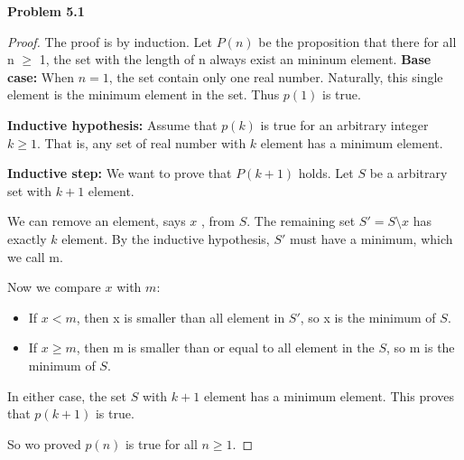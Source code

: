 \documentclass[12pt]{article}
\begin{document}
\noindent \textbf{Problem 5.1}
\smallbreak
\begin{proof}
    The proof is by induction. Let $P(n)$ be the proposition that there for all n $\ge$ 1, the set with the length of n always exist an mininum element.
    \textbf{Base case:} When $n = 1$, the set contain only one real number. Naturally, this single element is the minimum element in the set. Thus $p(1)$ is true.

    \textbf{Inductive hypothesis:} Assume that $p(k)$ is true for an arbitrary integer $k \ge 1$. That is, any set of real number with $k$ element has a minimum element.

    \textbf{Inductive step:} We want to prove that $P(k + 1)$ holds. Let $S$ be a arbitrary set with $k + 1$ element.

    We can remove an element, says $x$ , from $S$. The remaining set $S' = S \setminus x$ has exactly $k$ element. By the inductive hypothesis, $S'$ must have a minimum, which we call m. 

    Now we compare $x$ with $m$:
    \begin{itemize}
        \item If $x < m$, then x is smaller than all element in $S'$, so x is the minimum of $S$.
        \item If $x \ge m$, then m is smaller than or equal to all element in the $S$, so m is the minimum of $S$.
    \end{itemize}
    In either case, the set $S$ with $k + 1$ element has a minimum element. This proves that $p(k + 1)$ is true.

    So wo proved $p(n)$ is true for all $n \ge 1$.

\end{proof}
\end{document}
